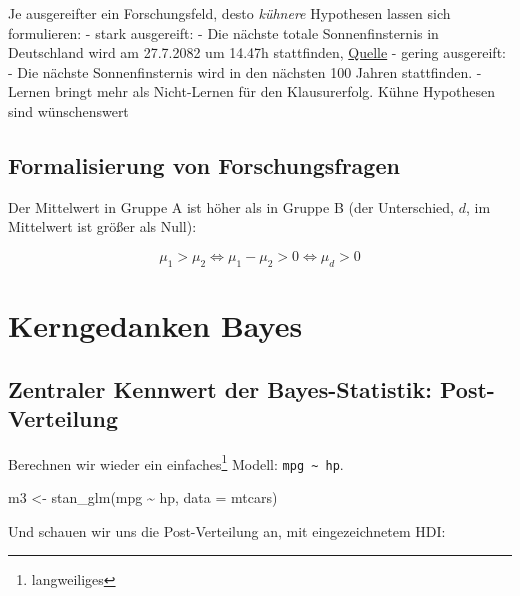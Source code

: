 \documentclass[
  a4paper,
  DIV=11]{scrreprt}
\newenvironment{Shaded}{\begin{snugshade}}{\end{snugshade}}
\newcommand{\AttributeTok}[1]{\textcolor[rgb]{0.40,0.45,0.13}{#1}}
\newcommand{\FunctionTok}[1]{\textcolor[rgb]{0.28,0.35,0.67}{#1}}
\newcommand{\NormalTok}[1]{\textcolor[rgb]{0.00,0.23,0.31}{#1}}
\newcommand{\OtherTok}[1]{\textcolor[rgb]{0.00,0.23,0.31}{#1}}
\newcommand{\SpecialCharTok}[1]{\textcolor[rgb]{0.37,0.37,0.37}{#1}}
\theoremstyle{definition}
\theoremstyle{remark}
\begin{document}
Je ausgereifter ein Forschungsfeld, desto \emph{kühnere} Hypothesen
lassen sich formulieren: - stark ausgereift: - Die nächste totale
Sonnenfinsternis in Deutschland wird am 27.7.2082 um 14.47h stattfinden,
\href{https://www.solar-eclipse.info/de/eclipse/country/DE/}{Quelle} -
gering ausgereift: - Die nächste Sonnenfinsternis wird in den nächsten
100 Jahren stattfinden. - Lernen bringt mehr als Nicht-Lernen für den
Klausurerfolg. Kühne Hypothesen sind wünschenswert 🦹

\hypertarget{formalisierung-von-forschungsfragen}{%
\subsection{Formalisierung von
Forschungsfragen}\label{formalisierung-von-forschungsfragen}}

Der Mittelwert in Gruppe A ist höher als in Gruppe B (der Unterschied,
\(d\), im Mittelwert ist größer als Null):

\[\mu_1 > \mu_2 \Leftrightarrow \mu_1 - \mu_2 > 0 \Leftrightarrow \mu_d > 0\]

\hypertarget{kerngedanken-bayes}{%
\section{Kerngedanken Bayes}\label{kerngedanken-bayes}}

\hypertarget{zentraler-kennwert-der-bayes-statistik-post-verteilung}{%
\subsection{Zentraler Kennwert der Bayes-Statistik:
Post-Verteilung}\label{zentraler-kennwert-der-bayes-statistik-post-verteilung}}

Berechnen wir wieder ein einfaches\footnote{langweiliges} Modell:
\texttt{mpg\ \textasciitilde{}\ hp}.

\begin{Shaded}
\begin{Highlighting}[]
\NormalTok{m3 }\OtherTok{\textless{}{-}} \FunctionTok{stan\_glm}\NormalTok{(mpg }\SpecialCharTok{\textasciitilde{}}\NormalTok{ hp, }\AttributeTok{data =}\NormalTok{ mtcars)}
\end{Highlighting}
\end{Shaded}

Und schauen wir uns die Post-Verteilung an, mit eingezeichnetem HDI:
\end{document}
